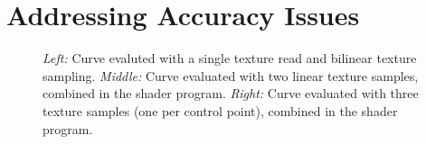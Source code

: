 \documentclass{jcgt}
\begin{document}
\section{Addressing Accuracy Issues}
\label{sec:addressingaccuracyissues}

  \begin{figure}
    \caption{\textit{Left:} Curve evaluted with a single texture read and bilinear texture sampling.  \textit{Middle:} Curve evaluated with two linear texture samples, combined in the shader program.  \textit{Right:} Curve evaluated with three texture samples (one per control point), combined in the shader program.}   
    \label{fig:samplehwsw}
  \end{figure} 
\end{document}
